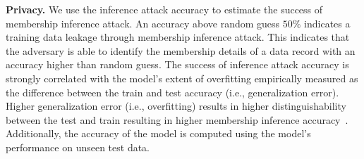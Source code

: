 \noindent\textbf{Privacy.} We use the inference attack accuracy to estimate the success of membership inference attack.
An accuracy above random guess $50\%$ indicates a training data leakage through membership inference attack.
This indicates that the adversary is able to identify the membership details of a data record with an accuracy higher than random guess.
The success of inference attack accuracy is strongly correlated with the model's extent of overfitting empirically measured as the difference between the train and test accuracy (i.e., generalization error). Higher generalization error (i.e., overfitting) results in higher distinguishability between the test and train resulting in higher membership inference accuracy~\cite{shokri2017membership}.
Additionally, the accuracy of the model is computed using the model's performance on unseen test data.
